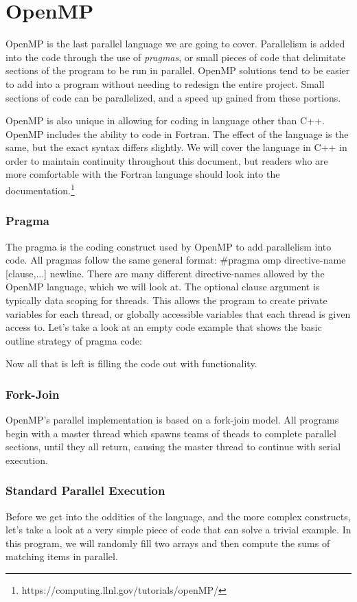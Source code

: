 \documentclass{article}
\newcommand{\comp}[1]{{\ttfamily #1}}
\begin{document}
\part{OpenMP}
OpenMP is the last parallel language we are going to cover. Parallelism is added into the code through the use of \emph{pragmas}, or small pieces of code that delimitate sections of the program to be run in parallel. OpenMP solutions tend to be easier to add into a program without needing to redesign the entire project. Small sections of code can be parallelized, and a speed up gained from these portions.

OpenMP is also unique in allowing for coding in language other than C++. OpenMP includes the ability to code in Fortran. The effect of the language is the same, but the exact syntax differs slightly. We will cover the language in C++ in order to maintain continuity throughout this document, but readers who are more comfortable with the Fortran language should look into the documentation.\footnote{\comp{https://computing.llnl.gov/tutorials/openMP/}}
	\section{Pragma}
	The pragma is the coding construct used by OpenMP to add parallelism into code. All pragmas follow the same general format: \comp{\#pragma omp directive-name [clause,...] newline}. There are many different \comp{directive-name}s allowed by the OpenMP language, which we will look at. The optional \comp{clause} argument is typically data scoping for threads. This allows the program to create private variables for each thread, or globally accessible variables that each thread is given access to. Let's take a look at an empty code example that shows the basic outline strategy of pragma code:
	
	
	
	Now all that is left is filling the code out with functionality.
	
	\section{Fork-Join}
	OpenMP's parallel implementation is based on a fork-join model. All programs begin with a master thread which spawns teams of theads to complete parallel sections, until they all return, causing the master thread to continue with serial execution.
	
	\section{Standard Parallel Execution}
	Before we get into the oddities of the language, and the more complex constructs, let's take a look at a very simple piece of code that can solve a trivial example. In this program, we will randomly fill two arrays and then compute the sums of matching items in parallel.
	 
	
\end{document}
